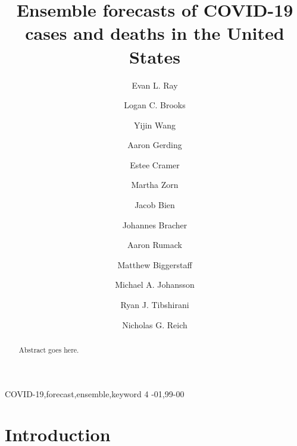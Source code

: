 \documentclass[review]{elsarticle}
\begin{document}
\begin{frontmatter}

\title{Ensemble forecasts of COVID-19 cases and deaths in the United States}

\author[umass,mysecondaryaddress]{Evan L. Ray}

\author[cmu]{Logan C. Brooks}

\author[umass]{Yijin Wang}

\author[umass]{Aaron Gerding}

\author[umass]{Estee Cramer}

\author[umass]{Martha Zorn}

\author[usc]{Jacob Bien}

\author[kit,hits]{Johannes Bracher}

\author[cmu]{Aaron Rumack}

\author[cdc]{Matthew Biggerstaff}

\author[cdc]{Michael A. Johansson}

\author[cmu]{Ryan J. Tibshirani}

\author[umass]{Nicholas G. Reich}

\address[umass]{School of Public Health and Health Sciences, University of Massachusetts Amherst}
\address[cmu]{Machine Learning Department, Carnegie Mellon University}
\address[usc]{Department of Data Sciences and Operations, University of Southern California}
\address[kit]{Chair of Econometrics and Statistics, Karlsruhe Institute of Technology}
\address[hits]{Computational Statistics Group, Heidelberg Institute for Theoretical Studies}
\address[cdc]{COVID-19 Response, U.S. Centers for Disease Control and Prevention}

\begin{abstract}
Abstract goes here.
\end{abstract}

\begin{keyword}
COVID-19\sep forecast\sep ensemble\sep keyword 4
-01\sep  99-00
\end{keyword}

\end{frontmatter}

\linenumbers

\section{Introduction}
\end{document}
